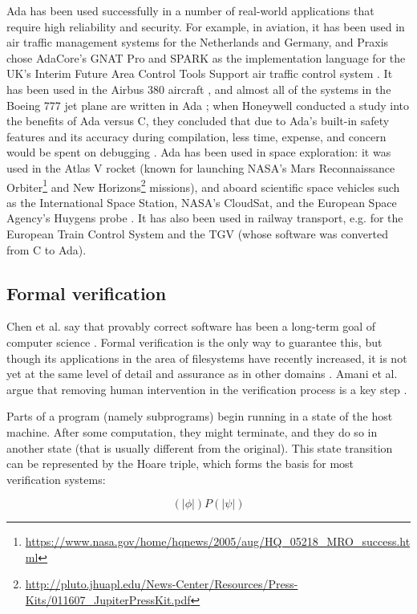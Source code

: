 Ada has been used successfully in a number of real-world applications that require high reliability and security.
For example, in aviation, it has been used in air traffic management systems for the Netherlands and Germany, and Praxis chose AdaCore's GNAT Pro and SPARK as the implementation language for the UK's Interim Future Area Control Tools Support air traffic control system \cite{adacore2007}.
It has been used in the Airbus 380 aircraft \cite{feldman2014}, and almost all of the systems in the Boeing 777 jet plane are written in Ada \cite{adaicBoeing}; when Honeywell conducted a study into the benefits of Ada versus C, they concluded that due to Ada's built-in safety features and its accuracy during compilation, less time, expense, and concern would be spent on debugging \cite{adaicBoeing}.
Ada has been used in space exploration: it was used in the Atlas V rocket (known for launching NASA's Mars Reconnaissance Orbiter\footnote{\url{https://www.nasa.gov/home/hqnews/2005/aug/HQ_05218_MRO_success.html}} and New Horizons\footnote{\url{http://pluto.jhuapl.edu/News-Center/Resources/Press-Kits/011607_JupiterPressKit.pdf}} missions), and aboard scientific space vehicles such as the International Space Station, NASA's CloudSat, and the European Space Agency's Huygens probe \cite{feldman2014}.
It has also been used in railway transport, e.g. for the European Train Control System and the TGV (whose software was converted from C to Ada).

\subsection{Formal verification}
Chen et al. say that provably correct software has been a long-term goal of computer science \cite{chen2015}.
Formal verification is the only way to guarantee this, but though its applications in the area of filesystems have recently increased, it is not yet at the same level of detail and assurance as in other domains \cite{amani2016}.
Amani et al. argue that removing human intervention in the verification process is a key step \cite{amani2016}.

Parts of a program (namely subprograms) begin running in a state of the host machine.
After some computation, they might terminate, and they do so in another state (that is usually different from the original).
This state transition can be represented by the Hoare triple, which forms the basis for most verification systems:

$$(\!|\phi|\!) P (\!|\psi|\!)$$

